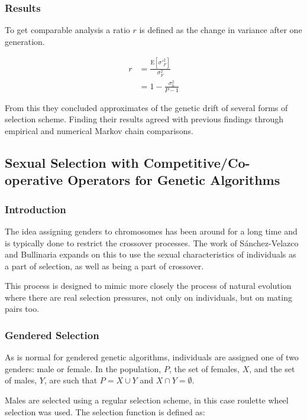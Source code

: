 \documentclass[10pt, a4paper]{article}
\begin{document}
\subsubsection{Results} 
To get comparable analysis a ratio $r$ is defined as the change in variance 
after one generation.

\begin{align}
r &= \frac{\text{E}[\sigma'^2_F]}{\sigma^2_F} \\
  &= 1-\frac{\sigma^2_n}{P-1}
\end{align}

From this they concluded approximates of the genetic drift of several forms of
selection scheme. Finding their results agreed with previous findings through
empirical and numerical Markov chain comparisons\cite{Schaffer1998Effect}.


\subsection{Sexual Selection with Competitive/Co-operative Operators for Genetic Algorithms}

\subsubsection{Introduction}
The idea assigning genders to chromosomes has been around for a long time%
and is typically done to restrict the crossover processes. The work of
S\'anchez-Velazco and Bullinaria\cite{SanchezVelazco2003Sexual} expands on this
to use the sexual characteristics of individuals as a part of selection, as 
well as being a part of crossover.

This process is designed to mimic more closely the process of natural evolution
where there are real selection pressures, not only on individuals, but on
mating pairs too.

\subsubsection{Gendered Selection}
As is normal for gendered genetic algorithms, individuals are assigned one of
two genders: male or female. In the population, $P$, the set of females, $X$,
and the set of males, $Y$, are such that $P = X \cup Y$ and $X \cap Y = \emptyset$.

Males are selected using a regular selection scheme, in this case roulette 
wheel selection was used. The selection function is defined as:
\end{document}
